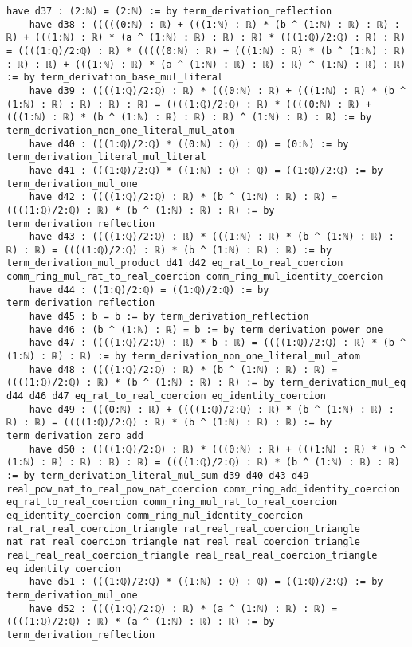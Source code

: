 \documentclass{article}
\begin{document}
\begin{tcolorbox}[colback=white!10, width=\linewidth]
\begin{lstlisting}[language=Lean4]
    have d37 : (2:ℕ) = (2:ℕ) := by term_derivation_reflection
    have d38 : (((((0:ℕ) : ℝ) + (((1:ℕ) : ℝ) * (b ^ (1:ℕ) : ℝ) : ℝ) : ℝ) + (((1:ℕ) : ℝ) * (a ^ (1:ℕ) : ℝ) : ℝ) : ℝ) * (((1:ℚ)/2:ℚ) : ℝ) : ℝ) = ((((1:ℚ)/2:ℚ) : ℝ) * (((((0:ℕ) : ℝ) + (((1:ℕ) : ℝ) * (b ^ (1:ℕ) : ℝ) : ℝ) : ℝ) + (((1:ℕ) : ℝ) * (a ^ (1:ℕ) : ℝ) : ℝ) : ℝ) ^ (1:ℕ) : ℝ) : ℝ) := by term_derivation_base_mul_literal
    have d39 : ((((1:ℚ)/2:ℚ) : ℝ) * (((0:ℕ) : ℝ) + (((1:ℕ) : ℝ) * (b ^ (1:ℕ) : ℝ) : ℝ) : ℝ) : ℝ) = ((((1:ℚ)/2:ℚ) : ℝ) * ((((0:ℕ) : ℝ) + (((1:ℕ) : ℝ) * (b ^ (1:ℕ) : ℝ) : ℝ) : ℝ) ^ (1:ℕ) : ℝ) : ℝ) := by term_derivation_non_one_literal_mul_atom
    have d40 : (((1:ℚ)/2:ℚ) * ((0:ℕ) : ℚ) : ℚ) = (0:ℕ) := by term_derivation_literal_mul_literal
    have d41 : (((1:ℚ)/2:ℚ) * ((1:ℕ) : ℚ) : ℚ) = ((1:ℚ)/2:ℚ) := by term_derivation_mul_one
    have d42 : ((((1:ℚ)/2:ℚ) : ℝ) * (b ^ (1:ℕ) : ℝ) : ℝ) = ((((1:ℚ)/2:ℚ) : ℝ) * (b ^ (1:ℕ) : ℝ) : ℝ) := by term_derivation_reflection
    have d43 : ((((1:ℚ)/2:ℚ) : ℝ) * (((1:ℕ) : ℝ) * (b ^ (1:ℕ) : ℝ) : ℝ) : ℝ) = ((((1:ℚ)/2:ℚ) : ℝ) * (b ^ (1:ℕ) : ℝ) : ℝ) := by term_derivation_mul_product d41 d42 eq_rat_to_real_coercion comm_ring_mul_rat_to_real_coercion comm_ring_mul_identity_coercion
    have d44 : ((1:ℚ)/2:ℚ) = ((1:ℚ)/2:ℚ) := by term_derivation_reflection
    have d45 : b = b := by term_derivation_reflection
    have d46 : (b ^ (1:ℕ) : ℝ) = b := by term_derivation_power_one
    have d47 : ((((1:ℚ)/2:ℚ) : ℝ) * b : ℝ) = ((((1:ℚ)/2:ℚ) : ℝ) * (b ^ (1:ℕ) : ℝ) : ℝ) := by term_derivation_non_one_literal_mul_atom
    have d48 : ((((1:ℚ)/2:ℚ) : ℝ) * (b ^ (1:ℕ) : ℝ) : ℝ) = ((((1:ℚ)/2:ℚ) : ℝ) * (b ^ (1:ℕ) : ℝ) : ℝ) := by term_derivation_mul_eq d44 d46 d47 eq_rat_to_real_coercion eq_identity_coercion
    have d49 : (((0:ℕ) : ℝ) + ((((1:ℚ)/2:ℚ) : ℝ) * (b ^ (1:ℕ) : ℝ) : ℝ) : ℝ) = ((((1:ℚ)/2:ℚ) : ℝ) * (b ^ (1:ℕ) : ℝ) : ℝ) := by term_derivation_zero_add
    have d50 : ((((1:ℚ)/2:ℚ) : ℝ) * (((0:ℕ) : ℝ) + (((1:ℕ) : ℝ) * (b ^ (1:ℕ) : ℝ) : ℝ) : ℝ) : ℝ) = ((((1:ℚ)/2:ℚ) : ℝ) * (b ^ (1:ℕ) : ℝ) : ℝ) := by term_derivation_literal_mul_sum d39 d40 d43 d49 real_pow_nat_to_real_pow_nat_coercion comm_ring_add_identity_coercion eq_rat_to_real_coercion comm_ring_mul_rat_to_real_coercion eq_identity_coercion comm_ring_mul_identity_coercion rat_rat_real_coercion_triangle rat_real_real_coercion_triangle nat_rat_real_coercion_triangle nat_real_real_coercion_triangle real_real_real_coercion_triangle real_real_real_coercion_triangle eq_identity_coercion
    have d51 : (((1:ℚ)/2:ℚ) * ((1:ℕ) : ℚ) : ℚ) = ((1:ℚ)/2:ℚ) := by term_derivation_mul_one
    have d52 : ((((1:ℚ)/2:ℚ) : ℝ) * (a ^ (1:ℕ) : ℝ) : ℝ) = ((((1:ℚ)/2:ℚ) : ℝ) * (a ^ (1:ℕ) : ℝ) : ℝ) := by term_derivation_reflection

\end{lstlisting}
\end{tcolorbox}
\end{document}
